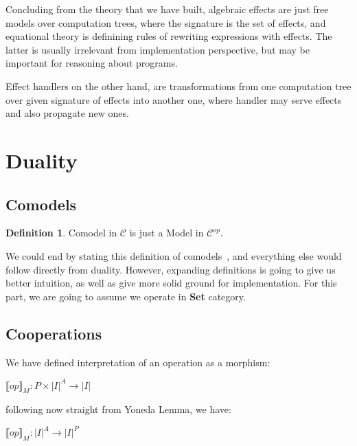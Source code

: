 \documentclass[declaration,shortabstract]{iithesis}
\theoremstyle{definition} \newtheorem{definition}{Definition}[chapter]
\theoremstyle{remark} \newtheorem{remark}[definition]{Observation}
\theoremstyle{plain} \newtheorem{theorem}[definition]{Theorem}
\theoremstyle{plain} \newtheorem{lemma}[definition]{Lemma}
\begin{document}
Concluding from the theory that we have built, algebraic effects are just free
models over computation trees, where the signature is the set of effects, and
equational theory is definining rules of rewriting expressions with effects.
The latter is usually irrelevant from implementation perspective, but may be
important for reasoning about programs.

Effect handlers on the other hand, are transformations from one computation
tree over given signature of effects into another one, where handler may serve
effects and also propagate new ones.

\section{Duality}\label{sec:duality}
    \subsection{Comodels}

    \begin{definition}
        Comodel in $\mathcal{C}$ is just a Model in $ \mathcal{C}^{op} $.
    \end{definition}

    We could end by stating this definition of comodels~\cite{comodels}, and
    everything else would follow directly from duality. However, expanding
    definitions is going to give us better intuition, as well as give more solid
    ground for implementation. For this part, we are going to assume we operate
    in \textbf{Set} category.

    \subsection{Cooperations}

    We have defined interpretation of an operation as a morphism:

    \begin{center}
        {$\displaystyle {\llbracket op \rrbracket}_M : P \times {|I|}^{A} \rightarrow |I| $}
    \end{center}

    \noindent
    following now straight from Yoneda Lemma, we have:

    \begin{center}
        {$\displaystyle {\llbracket op \rrbracket}_M : {|I|}^{A} \rightarrow |I|^{P} $}
    \end{center}
\end{document}
